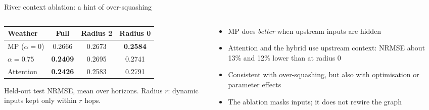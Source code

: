 \documentclass[aspectratio=169,10pt]{beamer}
\newcommand{\snote}[1]{{\scriptsize\textcolor{ink!70}{#1}}}
\begin{document}
\begin{frame}{River context ablation: a hint of over-squashing}
  \begin{columns}[c]
    \begin{column}{0.52\textwidth}
      \centering\small
      \begin{tabular}{@{}lccc@{}}
        \toprule
        Weather & Full & Radius 2 & Radius 0 \\
        \midrule
        MP ($\alpha=0$) & 0.2666 & 0.2673 & \textbf{0.2584} \\
        $\alpha=0.75$ & \textbf{0.2409} & 0.2695 & 0.2741 \\
        Attention & \textbf{0.2426} & 0.2583 & 0.2791 \\
        \bottomrule
      \end{tabular}

      \snote{Held-out test NRMSE, mean over horizons. Radius $r$: dynamic inputs kept only within $r$ hops.}
    \end{column}
    \begin{column}{0.44\textwidth}
      \begin{itemize}\small
        \item MP does \emph{better} when upstream inputs are hidden
        \item Attention and the hybrid use upstream context: NRMSE about 13\% and 12\% lower than at radius 0
        \item \alert{Consistent with} over-squashing, but also with optimisation or parameter effects
        \item The ablation masks inputs; it does not rewire the graph
      \end{itemize}
    \end{column}
  \end{columns}
\end{frame}
\end{document}
